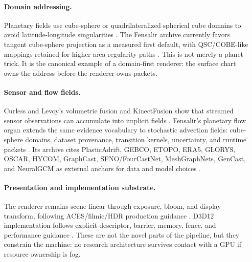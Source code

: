 \documentclass[11pt]{article}
\begin{document}
\paragraph{Domain addressing.}
Planetary fields use cube-sphere or quadrilateralized spherical cube domains to
avoid latitude-longitude singularities \cite{projQSC,nasaQSC,clarberg2018cube}.
The Fensalir archive currently favors tangent cube-sphere projection as a
measured first default, with QSC/COBE-like mappings retained for higher
area-regularity paths \cite{fensalirProjectionReport}.  This is not merely a
planet trick.  It is the canonical example of a domain-first renderer: the
surface chart owns the address before the renderer owns packets.

\paragraph{Sensor and flow fields.}
Curless and Levoy's volumetric fusion and KinectFusion show that streamed
sensor observations can accumulate into implicit fields
\cite{curless1996volumetric,newcombe2011kinectfusion}.  Fensalir's planetary
flow organ extends the same evidence vocabulary to stochastic advection fields:
cube-sphere domains, dataset provenance, transition kernels, uncertainty, and
runtime packets \cite{fensalirPlanetaryFlow}.  Its archive cites PlasticAdrift,
GEBCO, ETOPO, ERA5, GLORYS, OSCAR, HYCOM, GraphCast, SFNO/FourCastNet,
MeshGraphNets, GenCast, and NeuralGCM as external anchors for data and model
choices \cite{plasticadrift,mcadam2018transition,gebco2025,etopo2022,era5,
glorys,oscar,hycom,graphcast,sfno,fourcastnet,meshgraphnets,gencast,neuralgcm}.

\paragraph{Presentation and implementation substrate.}
The renderer remains scene-linear through exposure, bloom, and display
transform, following ACES/filmic/HDR production guidance
\cite{aces,epicAutoExposure,unrealBloom,jimenez2014,hableFilmic,
hablePiecewise,hableUncharted,lagarde2014frostbite}.  D3D12 implementation
follows explicit descriptor, barrier, memory, fence, and performance guidance
\cite{d3d12ResourceBinding,d3d12Fences,d3d12Memory,d3d12Interfaces,
directxBarriers,nvidiaBarriers,amdRdna,amdDma,amdGpuUpload}.  These are not the
novel parts of the pipeline, but they constrain the machine: no research
architecture survives contact with a GPU if resource ownership is fog.
\end{document}
